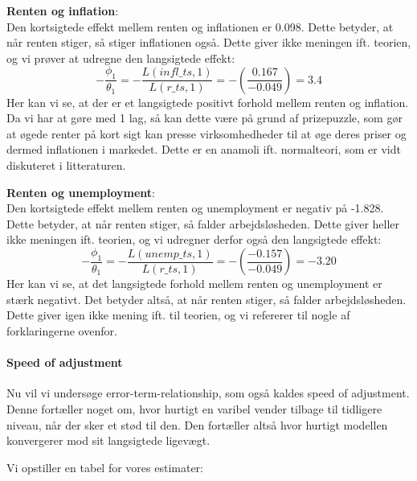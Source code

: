 \documentclass[
  10pt,
]{article}
\begin{document}
\textbf{Renten og inflation}:\\
Den kortsigtede effekt mellem renten og inflationen er 0.098. Dette
betyder, at når renten stiger, så stiger inflationen også. Dette giver
ikke meningen ift. teorien, og vi prøver at udregne den langsigtede
effekt:
\[-\frac{\phi_1}{\theta_1} = -\frac{L(infl\_ts,1)}{L(r\_ts,1)} = -\left( \frac{0.167}{-0.049}\right)=3.4 \]
Her kan vi se, at der er et langsigtede positivt forhold mellem renten
og inflation. Da vi har at gøre med 1 lag, så kan dette være på grund af
prizepuzzle, som gør at øgede renter på kort sigt kan presse
virksomhedheder til at øge deres priser og dermed inflationen i
markedet. Dette er en anamoli ift. normalteori, som er vidt diskuteret i
litteraturen.\\

\newpage

\textbf{Renten og unemployment}:\\
Den kortsigtede effekt mellem renten og unemployment er negativ på
-1.828. Dette betyder, at når renten stiger, så falder arbejdsløsheden.
Dette giver heller ikke meningen ift. teorien, og vi udregner derfor
også den langsigtede effekt:
\[-\frac{\phi_1}{\theta_1} = -\frac{L(unemp\_ts,1)}{L(r\_ts,1)} = -\left( \frac{-0.157}{-0.049}\right)=-3.20 \]
Her kan vi se, at det langsigtede forhold mellem renten og unemployment
er stærk negativt. Det betyder altså, at når renten stiger, så falder
arbejdsløsheden. Dette giver igen ikke mening ift. til teorien, og vi
refererer til nogle af forklaringerne ovenfor.

\hypertarget{speed-of-adjustment}{%
\paragraph{Speed of adjustment}\label{speed-of-adjustment}}

\leavevmode

Nu vil vi undersøge error-term-relationship, som også kaldes speed of
adjustment. Denne fortæller noget om, hvor hurtigt en varibel vender
tilbage til tidligere niveau, når der sker et stød til den. Den
fortæller altså hvor hurtigt modellen konvergerer mod sit langsigtede
ligevægt.

Vi opstiller en tabel for vores estimater:
\end{document}
